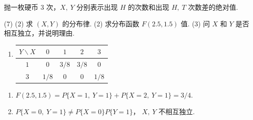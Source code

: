 \begin{problem}[本题12分]
  抛一枚硬币 $3$ 次，$X,~ Y$ 分别表示出现 $H$ 的次数和出现 $H,~ T$ 次数差的绝对值.
  \begin{tasks}[ label = \arabic*. ](7)
    \task*(2) 求 $(X,Y)$ 的分布律.
    \task*(2) 求分布函数 $F(2.5,1.5)$ 值.
    \task*(3) 问 $X$ 和 $Y$ 是否相互独立，并说明理由.
  \end{tasks}
\end{problem}
\begin{solution}\leavevmode\newline
  \begin{textfig}[5:8]\leavevmode
    \begin{enumerate}
      \renewcommand*\arraystretch{.5}
      \item 
      \begin{tabular}{*5c}
        \toprule
        $Y \backslash X$ & $0$   & $1$   & $2$   & $3$ \\
        \midrule
        $1$              & $0$   & $3/8$ & $3/8$ & $0$\\
        $3$              & $1/8$ & $0$   & $0$   & $1/8$\\
        \bottomrule
      \end{tabular}
    \end{enumerate}
    \textfigsplit
    \begin{enumerate}
      \addtocounter{enumi}{1}
      \item $F(2.5,1.5) = P\{X = 1,~ Y = 1\} + P\{X = 2,~ Y = 1\} = 3/4$.
      \item $P\{X = 0,~ Y = 1\} \neq P \{X = 0\}P\{Y = 1\}$，
      $X,~ Y$ 不相互独立.
    \end{enumerate}
  \end{textfig}
\end{solution}

